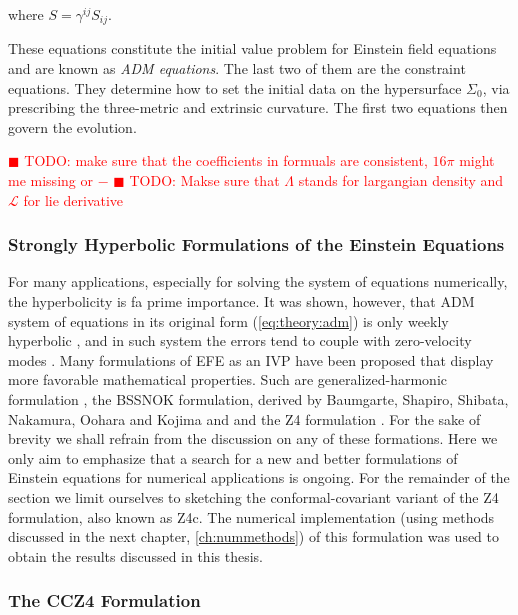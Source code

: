 \documentclass[11pt,a4paper,headinclude=true,DIV=14,BCOR=8mm,chapterprefix,listof=totoc,twoside,openright,abstracton]{scrbook}
\newcommand{\todo}[1]{\textcolor{red}{$\blacksquare$ TODO: #1}}
\begin{document}
where $S = \gamma^{ij}S_{ij}$.

These equations constitute the initial value problem for Einstein field equations and are known as \textit{ADM equations}. The last two of them are the constraint equations. They determine how to set the initial data on the hypersurface $\Sigma_0$, via prescribing the three-metric and extrinsic curvature. The first two equations then govern the evolution.

\todo{make sure that the coefficients in formuals are consistent, $16\pi$ might me missing or $-$}
\todo{Makse sure that $\Lambda$ stands for largangian density and $\mathcal{L}$ for lie derivative}


\subsubsection{Strongly Hyperbolic Formulations of the Einstein Equations}

For many applications, especially for solving the system of equations numerically, the hyperbolicity is fa prime importance. It was shown, however, that ADM system of equations in its original form (\ref{eq:theory:adm}) is only weekly hyperbolic \cite{Baumgarte:2002jm}, and in such system the errors tend to couple with zero-velocity modes \cite{Alcubierre:1999rt}. Many formulations of EFE as an IVP have been proposed that display more favorable mathematical properties. Such are generalized-harmonic formulation \cite{Friedrich:1985,Lindblom:2005qh,Lindblom:2009}, the BSSNOK formulation, derived by Baumgarte, Shapiro, Shibata, Nakamura, Oohara and Kojima \cite{Nakamura1987,Shibata:1995we,Baumgarte:1998te} and and the Z4 formulation \cite{Bona:2003fj,Bernuzzi:2009ex,Ruiz:2010qj,Weyhausen:2011cg,Alic:2011gg}. For the sake of brevity we shall refrain from the discussion on any of these formations. Here we only aim to emphasize that a search for a new and better formulations of Einstein equations for numerical applications is ongoing. For the remainder of the section we limit ourselves to sketching the conformal-covariant variant of the Z4 formulation, also known as Z4c. The numerical implementation (using methods discussed in the next chapter, \ref{ch:nummethods}) of this formulation was used to obtain the results discussed in this thesis. 

\subsubsection*{The CCZ4 Formulation}
\end{document}

